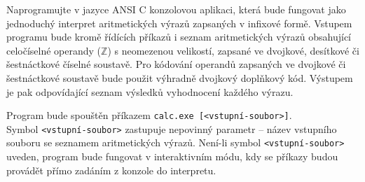 Naprogramujte v jazyce ANSI C konzolovou aplikaci, která bude fungovat jako jednoduchý interpret aritmetických výrazů zapsaných v infixové formě. Vstupem programu bude kromě řídících příkazů i seznam aritmetických výrazů obsahující celočíselné operandy ($\mathbb{Z}$) s neomezenou velikostí, zapsané ve dvojkové, desítkové či šestnáctkové číselné soustavě. Pro kódování operandů zapsaných ve dvojkové či šestnáctkové soustavě bude použit výhradně dvojkový doplňkový kód. Výstupem je pak odpovídající seznam výsledků vyhodnocení každého výrazu.

Program bude spouštěn příkazem \verb|calc.exe [<vstupní-soubor>]|. \\Symbol \verb|<vstupní-soubor>| zastupuje nepovinný parametr – název vstupního souboru se seznamem aritmetických výrazů. Není-li symbol \verb|<vstupní-soubor>| uveden, program bude fungovat v interaktivním módu, kdy se příkazy budou provádět přímo zadáním z konzole do interpretu.

